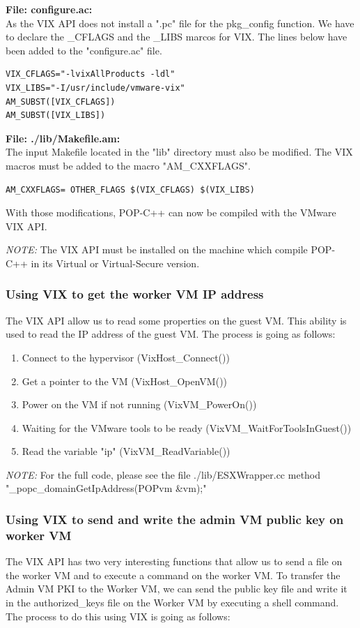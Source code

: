 \textbf{File: configure.ac:}\\
As the VIX API does not install a ".pc" file for the pkg\_config function. We have to declare the \_CFLAGS and the \_LIBS marcos for VIX. The lines below have been added to the "configure.ac" file. \s

\begin{lstlisting}
VIX_CFLAGS="-lvixAllProducts -ldl"
VIX_LIBS="-I/usr/include/vmware-vix"
AM_SUBST([VIX_CFLAGS])
AM_SUBST([VIX_LIBS])
\end{lstlisting}\s

\textbf{File: ./lib/Makefile.am:}\\
The input Makefile located in the "lib" directory must also be modified. The VIX macros must be added to the macro "AM\_CXXFLAGS". \s

\begin{lstlisting}
AM_CXXFLAGS= OTHER_FLAGS $(VIX_CFLAGS) $(VIX_LIBS)
\end{lstlisting}\s

With those modifications, POP-C++ can now be compiled with the VMware VIX API. \s

\textit{NOTE:} The VIX API must be installed on the machine which compile POP-C++ in its Virtual or Virtual-Secure version. 


\subsubsection{Using VIX to get the worker VM IP address}
The VIX API allow us to read some properties on the guest VM. This ability is used to read the IP address of the guest VM. The process is going as follows:

\begin{enumerate}
\item Connect to the hypervisor (VixHost\_Connect())
\item Get a pointer to the VM (VixHost\_OpenVM())
\item Power on the VM if not running (VixVM\_PowerOn())
\item Waiting for the VMware tools to be ready (VixVM\_WaitForToolsInGuest())
\item Read the variable "ip" (VixVM\_ReadVariable())
\end{enumerate}\s

\textit{NOTE:} For the full code, please see the file ./lib/ESXWrapper.cc method "\_popc\_domainGetIpAddress(POPvm \&vm);"

\subsubsection{Using VIX to send and write the admin VM public key on worker VM}
The VIX API has two very interesting functions that allow us to send a file on the worker VM and to execute a command on the worker VM. To transfer the Admin VM PKI to the Worker VM, we can send the public key file and write it in the authorized\_keys file on the Worker VM by executing a shell command. The process to do this using VIX is going as follows: \s

